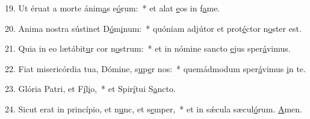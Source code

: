 19. Ut éruat a morte ánim\uline{a}s e\uline{ó}rum:~* et alat \uline{e}os in f\uline{a}me.\par 
20. Anima nostra sústinet D\uline{ó}m\uline{i}num:~* quóniam adjútor et prot\uline{é}ctor n\uline{o}ster est.\par 
21. Quia in eo lætábit\uline{u}r cor n\uline{o}strum:~* et in nómine sancto \uline{e}jus sper\uline{á}vimus.\par 
22. Fiat misericórdia tua, Dómine, s\uline{u}p\uline{e}r nos:~* quemádmodum sper\uline{á}vimus \uline{i}n te.\par 
23. Glória Patri, et F\uline{í}l\uline{i}o,~* et Spir\uline{í}tui S\uline{a}ncto.\par 
24. Sicut erat in princípio, et n\uline{u}nc, et s\uline{e}mper,~* et in sǽcula sæcul\uline{ó}rum. \uline{A}men.\par 
